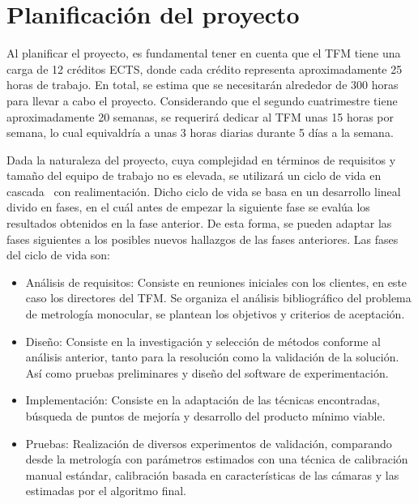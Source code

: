 \section{Planificación del proyecto}
Al planificar el proyecto, es fundamental tener en cuenta que el TFM 
tiene una carga de 12 créditos ECTS, donde cada 
crédito representa aproximadamente 25 horas de trabajo. 
En total, se estima que se necesitarán alrededor de 300 horas para llevar a cabo 
el proyecto.  Considerando que el segundo cuatrimestre tiene aproximadamente 20 semanas, 
se requerirá dedicar al TFM unas 15 horas por semana, lo cual equivaldría a unas 3 horas 
diarias durante 5 días a la semana.

Dada la naturaleza del proyecto, cuya complejidad en términos de requisitos y tamaño 
del equipo de trabajo no es elevada, se utilizará un ciclo de vida en cascada~\cite{ModeloEnCascada} con realimentación.
Dicho ciclo de vida se basa en un desarrollo lineal divido en fases, en el cuál antes 
de empezar la siguiente fase se evalúa los resultados obtenidos en la fase anterior. 
De esta forma, se pueden adaptar las fases siguientes a los posibles 
nuevos hallazgos de las fases anteriores.
Las fases del ciclo de vida son: 
\begin{itemize}
  \item Análisis de requisitos: Consiste en reuniones iniciales con los clientes, 
    en este caso los directores del TFM. Se organiza el análisis bibliográfico 
    del problema de metrología monocular, se plantean los objetivos y criterios de aceptación.
  \item Diseño: Consiste en la investigación y selección de métodos conforme 
    al análisis anterior, tanto para la resolución como la validación de la solución. 
    Así como pruebas preliminares y diseño del software de experimentación. 
  \item Implementación: Consiste en la adaptación de las técnicas encontradas, 
      búsqueda de puntos de mejoría y desarrollo del producto mínimo viable. 
  \item Pruebas: Realización de diversos experimentos de validación, 
      comparando desde la metrología con parámetros estimados con una técnica de calibración manual estándar, 
      calibración basada en características de las cámaras y las estimadas por el algoritmo final.
\end{itemize}
